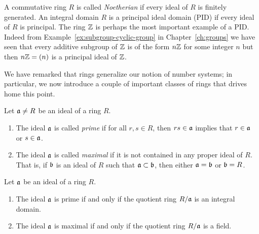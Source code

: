 A commutative ring \(R\) is called \emph{Noetherian} if every ideal of \(R\) is
finitely generated. An integral domain \(R\) is a principal ideal domain (PID)
if every ideal of \(R\) is principal. The ring \(\mathbb{Z}\) is perhaps the most
important example of a PID. Indeed from Example~\ref{ex:subgroup-cyclic-group}
in Chapter~\ref{ch:groups} we have seen that every additive subgroup of \(\mathbb{Z}\)
is of the form \(n\mathbb{Z}\) for some integer \(n\) but then \(n\mathbb{Z} = (n)\) is a
principal ideal of \(\mathbb{Z}\).

\medskip

We have remarked that rings generalize our notion of number systems; in
particular, we now introduce a couple of important classes of rings that drives
home this point.

\begin{definition}
    \label{def:prime-maximal-ideal}
    Let \(\mathfrak{a} \neq R\) be an ideal of a ring \(R\).

    \begin{enumerate}[label=(\alph*), wide]
        \item The ideal \(\mathfrak{a}\) is called \emph{prime} if for all \(r, s \in
        R\), then \(rs \in \mathfrak{a}\) implies that \(r \in \mathfrak{a}\) or \(s \in
        \mathfrak{a}\).
        \item The ideal \(\mathfrak{a}\) is called \emph{maximal} if it is not
        contained in any proper ideal of \(R\). That is, if \(\mathfrak{b}\) is an
        ideal of \(R\) such that \(\mathfrak{a} \subset \mathfrak{b}\), then either
        \(\mathfrak{a} = \mathfrak{b}\) or \(\mathfrak{b} = R\).
    \end{enumerate}
\end{definition}

\begin{theorem}
    \label{thm:prime-maximal-ideal-quotient}
    Let \(\mathfrak{a}\) be an ideal of a ring \(R\). 
    \begin{enumerate}[label=(\alph*)]
        \item The ideal \(\mathfrak{a}\) is prime if and only if the quotient ring
        \(R/\mathfrak{a}\) is an integral domain.
        \item The ideal \(\mathfrak{a}\) is maximal if and only if the quotient ring
        \(R/\mathfrak{a}\) is a field.
    \end{enumerate}
\end{theorem}

